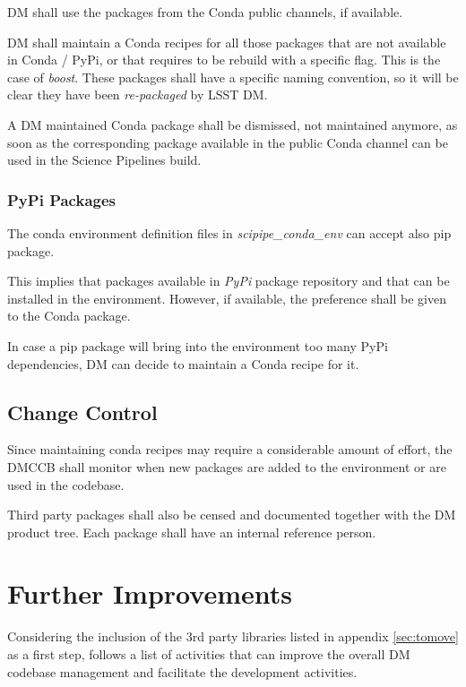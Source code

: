 DM shall use the packages from the Conda public channels, if available.

DM shall maintain a Conda recipes for all those packages that are not available in Conda / PyPi, or that requires to be rebuild with a specific flag. This is the case of \textit{boost}.
These packages shall have a specific naming convention, so it will be clear they have been \textit{re-packaged} by LSST DM.

A DM maintained Conda package shall be dismissed, not maintained anymore, as soon as the corresponding package available in the public Conda channel can be used in the Science Pipelines build.


\subsubsection{PyPi Packages} \label{sec:pypi}

The conda environment definition files in \textit{scipipe\_conda\_env} can accept also pip package. 

This implies that packages available in \textit{PyPi} package repository and that can be installed in the environment. 
However, if available, the preference shall be given to the Conda package.

In case a pip package will bring into the environment too many PyPi dependencies, DM can decide to maintain a Conda recipe for it.


\subsection{Change Control}

Since maintaining conda recipes may require a considerable amount of effort, the DMCCB shall monitor when new packages are added to the environment or are used in the codebase.

Third party packages shall also be censed and documented together with the DM product tree. 
Each package shall have an internal reference person.


\newpage
\section{Further Improvements}

Considering the inclusion of the 3rd party libraries listed in appendix \ref{sec:tomove} as a first step, follows a list of activities that can improve the overall DM codebase management and facilitate the development activities.

